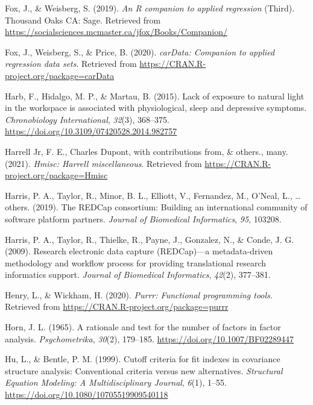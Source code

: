 \documentclass[
  english,
  man]{apa6}
\newlength{\cslhangindent}
\newlength{\cslentryspacingunit} %
\newenvironment{CSLReferences}[2] %
 {%
  \setlength{\parindent}{0pt}
  \ifodd #1
  \let\oldpar\par
  \def\par{\hangindent=\cslhangindent\oldpar}
  \fi
  \setlength{\parskip}{#2\cslentryspacingunit}
 }%
 {}
\begin{document}
\begin{CSLReferences}{1}{0}
\leavevmode{}%
Fox, J., \& Weisberg, S. (2019). \emph{An {R} companion to applied regression} (Third). Thousand Oaks {CA}: Sage. Retrieved from \url{https://socialsciences.mcmaster.ca/jfox/Books/Companion/}

\leavevmode{}%
Fox, J., Weisberg, S., \& Price, B. (2020). \emph{carData: Companion to applied regression data sets}. Retrieved from \url{https://CRAN.R-project.org/package=carData}

\leavevmode{}%
Harb, F., Hidalgo, M. P., \& Martau, B. (2015). Lack of exposure to natural light in the workspace is associated with physiological, sleep and depressive symptoms. \emph{Chronobiology International}, \emph{32}(3), 368--375. \url{https://doi.org/10.3109/07420528.2014.982757}

\leavevmode{}%
Harrell Jr, F. E., Charles Dupont, with contributions from, \& others., many. (2021). \emph{Hmisc: Harrell miscellaneous}. Retrieved from \url{https://CRAN.R-project.org/package=Hmisc}

\leavevmode{}%
Harris, P. A., Taylor, R., Minor, B. L., Elliott, V., Fernandez, M., O'Neal, L., \ldots{} others. (2019). The REDCap consortium: Building an international community of software platform partners. \emph{Journal of Biomedical Informatics}, \emph{95}, 103208.

\leavevmode{}%
Harris, P. A., Taylor, R., Thielke, R., Payne, J., Gonzalez, N., \& Conde, J. G. (2009). Research electronic data capture (REDCap)---a metadata-driven methodology and workflow process for providing translational research informatics support. \emph{Journal of Biomedical Informatics}, \emph{42}(2), 377--381.

\leavevmode{}%
Henry, L., \& Wickham, H. (2020). \emph{Purrr: Functional programming tools}. Retrieved from \url{https://CRAN.R-project.org/package=purrr}

\leavevmode{}%
Horn, J. L. (1965). A rationale and test for the number of factors in factor analysis. \emph{Psychometrika}, \emph{30}(2), 179--185. \url{https://doi.org/10.1007/BF02289447}

\leavevmode{}%
Hu, L., \& Bentle, P. M. (1999). Cutoff criteria for fit indexes in covariance structure analysis: {Conventional} criteria versus new alternatives. \emph{Structural Equation Modeling: A Multidisciplinary Journal}, \emph{6}(1), 1--55. \url{https://doi.org/10.1080/10705519909540118}


\end{CSLReferences}
\end{document}
